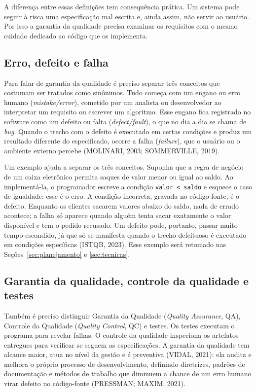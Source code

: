 \documentclass[12pt,a4paper]{article}
\begin{document}
A diferença entre essas definições tem consequência prática. Um sistema pode seguir à risca uma especificação mal escrita e, ainda assim, não servir ao usuário. Por isso a garantia da qualidade precisa examinar os requisitos com o mesmo cuidado dedicado ao código que os implementa.

\subsection{Erro, defeito e falha}
\label{sec:erro}

Para falar de garantia da qualidade é preciso separar três conceitos que costumam ser tratados como sinônimos. Tudo começa com um engano ou erro humano (\textit{mistake/error}), cometido por um analista ou desenvolvedor ao interpretar um requisito ou escrever um algoritmo. Esse engano fica registrado no software como um defeito ou falta (\textit{defect/fault}), o que no dia a dia se chama de \textit{bug}. Quando o trecho com o defeito é executado em certas condições e produz um resultado diferente do especificado, ocorre a falha (\textit{failure}), que o usuário ou o ambiente externo percebe (MOLINARI, 2003; SOMMERVILLE, 2019).

Um exemplo ajuda a separar os três conceitos. Suponha que a regra de negócio de um caixa eletrônico permita saques de valor menor ou igual ao saldo. Ao implementá-la, o programador escreve a condição \texttt{valor < saldo} e esquece o caso de igualdade: esse é o erro. A condição incorreta, gravada no código-fonte, é o defeito. Enquanto os clientes sacarem valores abaixo do saldo, nada de errado acontece; a falha só aparece quando alguém tenta sacar exatamente o valor disponível e tem o pedido recusado. Um defeito pode, portanto, passar muito tempo escondido, já que só se manifesta quando o trecho defeituoso é executado em condições específicas (ISTQB, 2023). Esse exemplo será retomado nas Seções~\ref{sec:planejamento} e \ref{sec:tecnicas}.

\subsection{Garantia da qualidade, controle da qualidade e testes}
\label{sec:vv}

Também é preciso distinguir Garantia da Qualidade (\textit{Quality Assurance}, QA), Controle da Qualidade (\textit{Quality Control}, QC) e testes. Os testes executam o programa para revelar falhas. O controle da qualidade inspeciona os artefatos entregues para verificar se seguem as especificações. A garantia da qualidade tem alcance maior, atua no nível da gestão e é preventiva (VIDAL, 2021): ela audita e melhora o próprio processo de desenvolvimento, definindo diretrizes, padrões de documentação e métodos de trabalho que diminuem a chance de um erro humano virar defeito no código-fonte (PRESSMAN; MAXIM, 2021).
\end{document}
